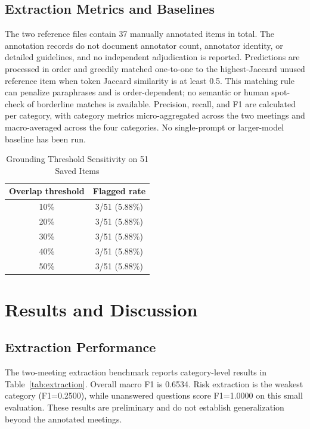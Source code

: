 \documentclass[conference]{IEEEtran}
\begin{document}
\subsection{Extraction Metrics and Baselines}
The two reference files contain 37 manually annotated items in total. The annotation records do not document annotator count, annotator identity, or detailed guidelines, and no independent adjudication is reported. Predictions are processed in order and greedily matched one-to-one to the highest-Jaccard unused reference item when token Jaccard similarity is at least 0.5. This matching rule can penalize paraphrases and is order-dependent; no semantic or human spot-check of borderline matches is available. Precision, recall, and F1 are calculated per category, with category metrics micro-aggregated across the two meetings and macro-averaged across the four categories. No single-prompt or larger-model baseline has been run.

\begin{table}[t]
\caption{Grounding Threshold Sensitivity on 51 Saved Items}
\label{tab:grounding_sensitivity}
\centering
\footnotesize
\begin{tabular}{@{}cc@{}}
\toprule
\textbf{Overlap threshold} & \textbf{Flagged rate} \\
\midrule
10\% & 3/51 (5.88\%) \\
20\% & 3/51 (5.88\%) \\
30\% & 3/51 (5.88\%) \\
40\% & 3/51 (5.88\%) \\
50\% & 3/51 (5.88\%) \\
\bottomrule
\end{tabular}
\end{table}

\section{Results and Discussion}

\subsection{Extraction Performance}
The two-meeting extraction benchmark reports category-level results in Table~\ref{tab:extraction}. Overall macro F1 is 0.6534. Risk extraction is the weakest category (F1=0.2500), while unanswered questions score F1=1.0000 on this small evaluation. These results are preliminary and do not establish generalization beyond the annotated meetings.
\end{document}
